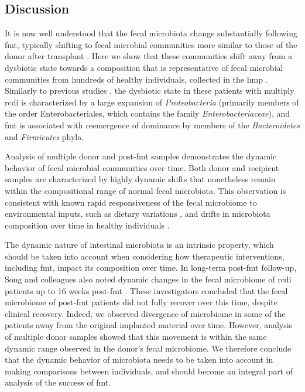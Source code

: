 \subsection{Discussion}
It is now well understood that the fecal microbiota change substantially following \gls{fmt}, typically shifting to fecal microbial communities more similar to those of the donor after transplant \cite{RN53moviefmt, RN30, RN66, RN31, RN36, RN4129, RN1}. Here we show that these communities shift away from a dysbiotic state towards a composition that is representative of fecal microbial communities from hundreds of healthy individuals, collected in the \gls{hmp} \cite{RN75}. Similarly to previous studies \cite{RN53moviefmt, RN30, RN31, RN4129, RN1}, the dysbiotic state in these patients with multiply \gls{rcdi} is characterized by a large expansion of \textit{Proteobacteria} (primarily members of the order Enterobact\textit{}eriales, which contains the family \textit{Enterobacteriaceae}), and \gls{fmt} is associated with reemergence of dominance by members of the \textit{Bacteroidetes} and \textit{Firmicutes} phyla.

Analysis of multiple donor and post-\gls{fmt} samples demonstrates the dynamic behavior of fecal microbial communities over time. Both donor and recipient samples are characterized by highly dynamic shifts that nonetheless remain within the compositional range of normal fecal microbiota. This observation is consistent with known rapid responsiveness of the fecal microbiome to environmental inputs, such as dietary variations \cite{RN4235}, and drifts in microbiota composition over time in healthy individuals \cite{RN84}. 

The dynamic nature of intestinal microbiota is an intrinsic property, which should be taken into account when considering how therapeutic interventions, including \gls{fmt}, impact its composition over time. In long-term post-\gls{fmt} follow-up, Song and colleagues also noted dynamic changes in the fecal microbiome of \gls{rcdi} patients up to 16 weeks post-\gls{fmt} \cite{RN35moviefmt}. These investigators concluded that the fecal microbiome of post-\gls{fmt} patients did not fully recover over this time, despite clinical recovery. Indeed, we observed divergence of microbiome in some of the patients away from the original implanted material over time. However, analysis of multiple donor samples showed that this movement is within the same dynamic range observed in the donor's fecal microbiome. We therefore conclude that the dynamic behavior of microbiota needs to be taken into account in making comparisons between individuals, and should become an integral part of analysis of the success of \gls{fmt}.

